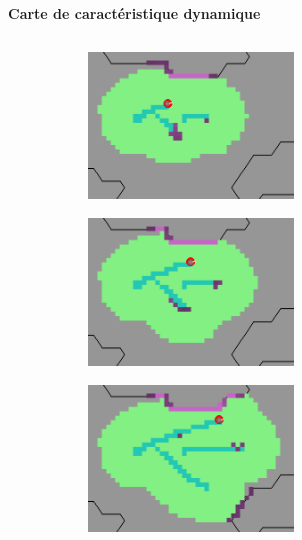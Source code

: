 \documentclass[aspectratio=169,10pt]{beamer}
\begin{document}
\begin{frame}{\textbf{Carte de caractéristique dynamique}}
\begin{columns}
\begin{column}{0.7\textwidth}
			\begin{figure}[H]
				\centering
				\begin{subfigure}{0.32\textwidth}
					\centering
					\includegraphics[width=0.6\textwidth]{IMAGES/lgm_t1_c.png}
				\end{subfigure}
				\hfill
				\begin{subfigure}{0.32\textwidth}
					\centering
					\includegraphics[width=0.6\textwidth]{IMAGES/lgm_t2_c.png}
				\end{subfigure}
				\hfill
				\begin{subfigure}{0.32\textwidth}
					\centering
					\includegraphics[width=0.6\textwidth]{IMAGES/lgm_t3_c.png}
				\end{subfigure}
			\end{figure}
			


\end{column}
\end{columns}
\end{frame}
\end{document}
